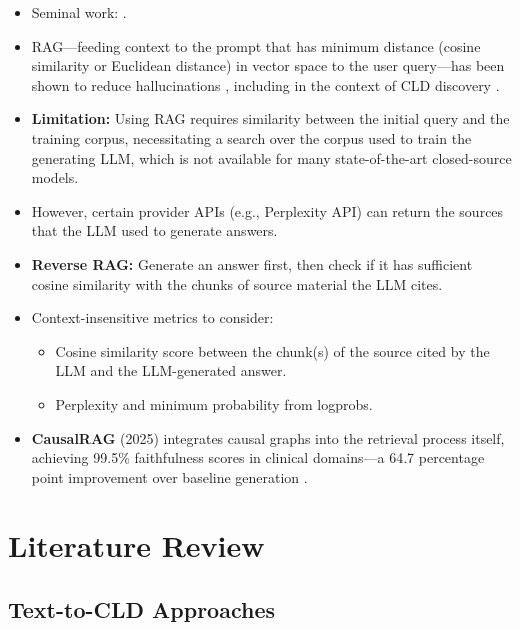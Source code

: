 \documentclass[12pt]{article}
\begin{document}
\begin{itemize}
    \item Seminal work: \cite{lewis2021retrieval}.
    \item RAG---feeding context to the prompt that has minimum distance (cosine similarity or Euclidean distance) in vector space to the user query---has been shown to reduce hallucinations \cite{lewis2020retrieval}, including in the context of CLD discovery \cite{zhang2024causal}.
    \item \textbf{Limitation:} Using RAG requires similarity between the initial query and the training corpus, necessitating a search over the corpus used to train the generating LLM, which is not available for many state-of-the-art closed-source models.
    \item However, certain provider APIs (e.g., Perplexity API) can return the sources that the LLM used to generate answers.
    \item \textbf{Reverse RAG:} Generate an answer first, then check if it has sufficient cosine similarity with the chunks of source material the LLM cites.
    \item Context-insensitive metrics to consider:
    \begin{itemize}
        \item Cosine similarity score between the chunk(s) of the source cited by the LLM and the LLM-generated answer.
        \item Perplexity and minimum probability from logprobs.
    \end{itemize}
    \item \textbf{CausalRAG} (2025) integrates causal graphs into the retrieval process itself, achieving 99.5\% faithfulness scores in clinical domains---a 64.7 percentage point improvement over baseline generation \cite{wang2025causalrag}.
\end{itemize}

\section{Literature Review}

\subsection{Text-to-CLD Approaches}
\end{document}

